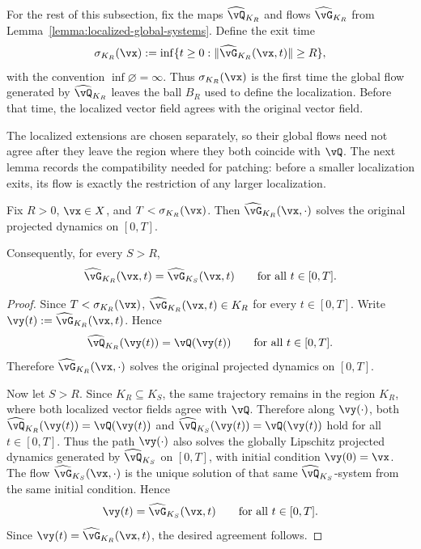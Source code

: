For the rest of this subsection, fix the maps $\widehat{\vQ}_{K_R}$ and flows
$\widehat{\vG}_{K_R}$ from Lemma~\ref{lemma:localized-global-systems}. Define
the exit time
\[
\sigma_{K_R}(\vx):=\inf\{t\ge 0:\|\widehat{\vG}_{K_R}(\vx,t)\|\ge R\},
\]
with the convention $\inf\varnothing=\infty$.
Thus $\sigma_{K_R}(\vx)$ is the first time the global flow generated by
$\widehat{\vQ}_{K_R}$ leaves the ball $B_R$ used to define the
localization. Before that time, the localized vector field agrees with the
original vector field.

The localized extensions are chosen separately, so their global flows need not
agree after they leave the region where they both coincide with $\vQ$. The next
lemma records the compatibility needed for patching: before a smaller
localization exits, its flow is exactly the restriction of any larger
localization.

\begin{lemma}\label{lemma:localized-consistency}
Fix $R>0$, $\vx\in X$, and $T<\sigma_{K_R}(\vx)$. Then
$\widehat{\vG}_{K_R}(\vx,\cdot)$ solves the original projected dynamics on
$[0,T]$.

Consequently, for every $S>R$,
\[
\widehat{\vG}_{K_R}(\vx,t)=\widehat{\vG}_{K_S}(\vx,t)
\qquad \text{for all }t\in[0,T].
\]
\end{lemma}
\begin{proof}
Since $T<\sigma_{K_R}(\vx)$,
$\widehat{\vG}_{K_R}(\vx,t)\in K_R$ for every $t\in[0,T]$. Write
$\vy(t):=\widehat{\vG}_{K_R}(\vx,t)$. Hence
\[
\widehat{\vQ}_{K_R}(\vy(t))=\vQ(\vy(t))
\qquad \text{for all }t\in[0,T].
\]
Therefore $\widehat{\vG}_{K_R}(\vx,\cdot)$ solves the original projected
dynamics on $[0,T]$.

Now let $S>R$. Since $K_R\subseteq K_S$, the same trajectory remains in the
region $K_R$, where both localized vector fields agree with $\vQ$. Therefore
along $\vy(\cdot)$, both
$\widehat{\vQ}_{K_R}(\vy(t))=\vQ(\vy(t))$ and
$\widehat{\vQ}_{K_S}(\vy(t))=\vQ(\vy(t))$ hold for all $t\in[0,T]$.
Thus the path $\vy(\cdot)$ also solves the globally Lipschitz projected
dynamics generated by $\widehat{\vQ}_{K_S}$ on $[0,T]$, with initial condition
$\vy(0)=\vx$. The flow
$\widehat{\vG}_{K_S}(\vx,\cdot)$ is the unique solution of that same
$\widehat{\vQ}_{K_S}$-system from the same initial condition. Hence
\[
\vy(t)=\widehat{\vG}_{K_S}(\vx,t)
\qquad \text{for all }t\in[0,T].
\]
Since $\vy(t)=\widehat{\vG}_{K_R}(\vx,t)$, the desired agreement follows.
\end{proof}

